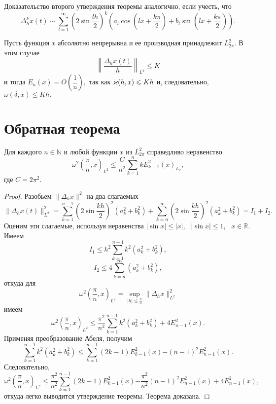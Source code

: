 Доказательство второго утверждения теоремы аналогично, {если учесть, что}
$$
{\Delta_h^k x(t)\sim\sum_{l=1}^\infty\left(2\sin \frac{lh}{2}\right)^k
\left(a_l\cos \left(lx+\frac{k\pi}{2}\right)+ b_l\sin \left(lx+\frac{k\pi}{2}\right)\right).}
$$

\begin{Corollary}
Пусть функция $x$ абсолютно непрерывна и ее производная принадлежит {$L^2_{2\pi}.$} В этом случае
$$
\left\| \frac{\Delta_h x(t)}{h}\right\|_{{L^2}}\le K
$$
и тогда $E_n(x)=O\left( \dfrac{1}{n}\right),$ так как $\varkappa(h,x)\leqslant Kh$ и, следовательно, $\omega(\delta,x)\le Kh.$
\end{Corollary}

\section{Обратная теорема}

\begin{teo} Для каждого $n\in\mathbb N$ и любой функции $x$ из $L^2_{2\pi}$
справедливо неравенство
$$
\omega^2\left( \frac{\pi}{n},x\right)_{{L^2}}\le \frac{C}{n^2}
\sum\limits_{{k=1}}^nkE_{{k-1}}^2(x)_{L_2},
$$
где $C=2\pi^2$.
\end{teo}

\begin{proof}
Разобьем $\|\Delta_h x\|^2$ на два слагаемых
$$\|\Delta_hx(t)\|_{L^2}^2 =
\sum\limits_{k=1}^{n-1}\left(2\sin\frac{kh}{2}\right)^2(a_k^2+b_k^2) +
\sum\limits_{k=n}^\infty\left(2\sin\frac{kh}{2}\right)^2(a_k^2+b_k^2) = I_1 + I_2.
$$
Оценим эти слагаемые, используя неравенства $|\sin x|\le|x|$,~ $|\sin x|\le1$,~
$x\in\mathbb R$. Имеем
$$I_1\le h^2\sum\limits_{k=1}^{n-1}k^2(a_k^2+b_k^2),
$$
$$
I_2\le 4\sum\limits_{k=n}^\infty (a_k^2+b_k^2),$$
откуда для
$$
\omega^2\left(\frac{\pi}{n},x\right)_{{L^2}} =
\sup_{|h|\le\frac{\pi}{n}}\|\Delta_hx\|^2_{{L^2}}
$$
имеем
$$
\omega^2\left(\frac{\pi}{n},x\right)_{{L^2}} \le \frac{\pi^2}{n^2}
\sum\limits_{k=1}^{n-1}k^2(a_k^2+b_k^2)+4E_{n-1}^2(x).
$$
Применяя
преобразование Абеля, получим
$$
\sum\limits_{k=1}^{n-1}k^2(a_k^2+b_k^2)\le
\sum\limits_{k=1}^{n-1}(2k-1)E_{k-1}^2(x)
{-(n-1)^2E_{n-1}^2(x)}.
$$
Следовательно,
$$
\omega^2\left(\frac{\pi}{n},x\right)_{{L^2}}\le
\frac{\pi^2}{n^2}\sum\limits_{k=1}^{n-1}(2k-1)E_{k-1}^2(x)
{-\frac{\pi^2}{n^2}(n-1)^2E_{n-1}^2(x)}+4E_{n-1}^2(x),
$$
{откуда легко выводится утверждение теоремы.}
Теорема доказана.
\end{proof}
